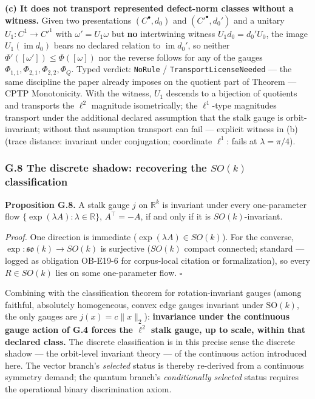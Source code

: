 \documentclass[
  11pt,
]{article}
\begin{document}
\textbf{(c) It does not transport represented defect-norm classes without a witness.} Given two presentations \((C^\bullet,d_0)\) and \((C'^\bullet,d_0')\) and a unitary \(U_1:C^1\to C'^1\) with \(\omega'=U_1\omega\) but \textbf{no} intertwining witness \(U_1d_0=d_0'U_0\), the image \(U_1(\operatorname{im} d_0)\) bears no declared relation to \(\operatorname{im} d_0'\), so neither \(\Phi'([\omega'])\le\Phi([\omega])\) nor the reverse follows for any of the gauges \(\Phi_{1,1},\Phi_{2,1},\Phi_{2,2},\Phi_Q\). Typed verdict: \texttt{NoRule} / \texttt{TransportLicenseNeeded} --- the same discipline the paper already imposes on the quotient part of Theorem --- CPTP Monotonicity. With the witness, \(U_1\) descends to a bijection of quotients and transports the \(\ell^2\) magnitude isometrically; the \(\ell^1\)-type magnitudes transport under the additional declared assumption that the stalk gauge is orbit-invariant; without that assumption transport can fail --- explicit witness in (b) (trace distance: invariant under conjugation; coordinate \(\ell^1\): fails at \(\lambda=\pi/4\)).

\subsubsection{\texorpdfstring{G.8 The discrete shadow: recovering the \(SO(k)\) classification}{G.8 The discrete shadow: recovering the SO(k) classification}}\label{g.8-the-discrete-shadow-recovering-the-sok-classification}

\textbf{Proposition G.8.} A stalk gauge \(j\) on \(\mathbb R^k\) is invariant under every one-parameter flow \(\{\exp(\lambda A):\lambda\in\mathbb R\}\), \(A^\top=-A\), if and only if it is \(SO(k)\)-invariant.

\emph{Proof.} One direction is immediate (\(\exp(\lambda A)\in SO(k)\)). For the converse, \(\exp:\mathfrak{so}(k)\to SO(k)\) is surjective (\(SO(k)\) compact connected; standard --- logged as obligation OB-E19-6 for corpus-local citation or formalization), so every \(R\in SO(k)\) lies on some one-parameter flow. \(\square\)

Combining with the classification theorem for rotation-invariant gauges (among faithful, absolutely homogeneous, convex edge gauges invariant under \(\mathrm{SO}(k)\), the only gauges are \(j(x)=c\|x\|_2\)): \textbf{invariance under the continuous gauge action of G.4 forces the \(\ell^2\) stalk gauge, up to scale, within that declared class.} The discrete classification is in this precise sense the discrete shadow --- the orbit-level invariant theory --- of the continuous action introduced here. The vector branch's \emph{selected} status is thereby re-derived from a continuous symmetry demand; the quantum branch's \emph{conditionally selected} status requires the operational binary discrimination axiom.
\end{document}
